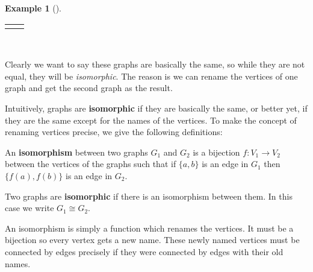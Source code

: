 \documentclass[12pt,]{book}
\newcommand{\terminology}[1]{\textbf{#1}}
\theoremstyle{plain}
\theoremstyle{definition}
\theoremstyle{definition}
\newtheorem{example}[theorem]{Example}
\theoremstyle{definition}
\numberwithin{equation}{chapter}
\newlength{\panelmax}
\newcommand{\isom}{\cong}
\begin{document}
\begin{example}[]
{\setlength{\panelmax}{\maxof{\panelmax}{\phBimage}}
\leavevmode%
\setlength{\tabcolsep}{0.125\linewidth}
\par\medskip\noindent
\hspace*{0.125\linewidth}%
\begin{tabular}{@{}*{2}{c}@{}}
\begin{minipage}[c][\panelmax][b]{0.25\linewidth}\usebox{\panelboxAimage}\end{minipage}&
\begin{minipage}[c][\panelmax][b]{0.25\linewidth}\usebox{\panelboxBimage}\end{minipage}\end{tabular}\\
}%
\par
\hypertarget{p-1525}{}%
Clearly we want to say these graphs are basically the same, so while they are not equal, they will be \emph{isomorphic}. The reason is we can rename the vertices of one graph and get the second graph as the result.%
\end{example}
\hypertarget{p-1526}{}%
Intuitively, graphs are \terminology{isomorphic}  if they are basically the same, or better yet, if they are the same except for the names of the vertices. To make the concept of renaming vertices precise, we give the following definitions:%
\begin{assemblage}\label{assemblage-36}
\hypertarget{p-1527}{}%
 An \terminology{isomorphism} between two graphs \(G_1\) and \(G_2\) is a bijection \(f:V_1 \to V_2\) between the vertices of the graphs such that if \(\{a,b\}\) is an edge in \(G_1\) then \(\{f(a), f(b)\}\) is an edge in \(G_2\).%
\par
\hypertarget{p-1528}{}%
Two graphs are \terminology{isomorphic} if there is an isomorphism between them. In this case we write \(G_1 \isom G_2\).%
\end{assemblage}
\hypertarget{p-1529}{}%
An isomorphism is simply a function which renames the vertices. It must be a bijection so every vertex gets a new name. These newly named vertices must be connected by edges precisely if they were connected by edges with their old names.%
\end{document}

